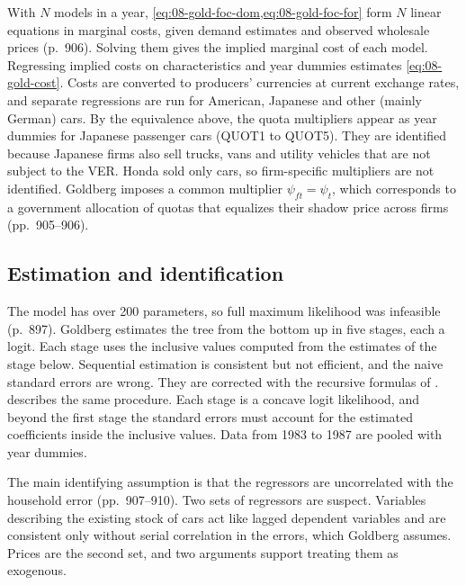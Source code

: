  With $N$ models in a year, \cref{eq:08-gold-foc-dom,eq:08-gold-foc-for} form $N$
linear equations in marginal costs, given demand estimates and observed wholesale prices (p.~906). Solving them
gives the implied marginal cost of each model. Regressing implied costs on characteristics and year dummies
estimates \cref{eq:08-gold-cost}. Costs are converted to producers' currencies at current exchange rates, and
separate regressions are run for American, Japanese and other (mainly German) cars. By the equivalence above,
the quota multipliers appear as year dummies for Japanese passenger cars (QUOT1 to QUOT5). They are identified
because Japanese firms also sell trucks, vans and utility vehicles that are not subject to the VER. Honda sold
only cars, so firm-specific multipliers are not identified. Goldberg imposes a common multiplier
$\psi_{ft} = \psi_t$, which corresponds to a government allocation of quotas that equalizes their shadow price
across firms (pp.~905--906).

\subsection{Estimation and identification}\label{sec:08-goldberg-identification}

 The model has over 200 parameters, so full maximum likelihood was
infeasible (p.~897). Goldberg estimates the tree from the bottom up in five stages, each a logit. Each stage uses
the inclusive values computed from the estimates of the stage below. Sequential estimation is consistent but not
efficient, and the naive standard errors are wrong. They are corrected with the recursive formulas of
\citet{McFadden1981}. \citet[p.~1426]{McFadden1984} describes the same procedure. Each stage is a concave logit
likelihood, and beyond the first stage the standard errors must account for the estimated coefficients inside the
inclusive values. Data from 1983 to 1987 are pooled with year dummies.

 The main identifying assumption is that the regressors are
uncorrelated with the household error (pp.~907--910). Two sets of regressors are suspect. Variables describing
the existing stock of cars act like lagged dependent variables and are consistent only without serial
correlation in the errors, which Goldberg assumes. Prices are the second set, and two arguments support treating
them as exogenous.

